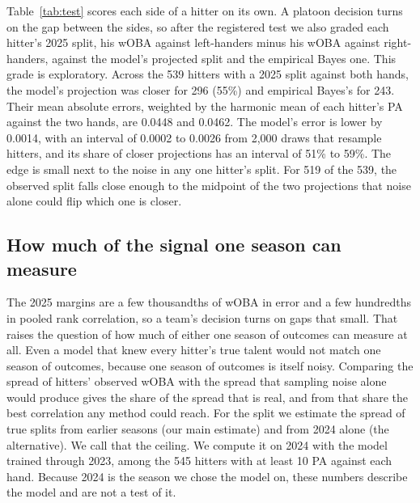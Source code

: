 \documentclass[11pt,letterpaper]{article}
\begin{document}
Table~\ref{tab:test} scores each side of a hitter on its own. A platoon decision turns on the gap between the sides, so after the registered test we also graded each hitter's 2025 split, his wOBA against left-handers minus his wOBA against right-handers, against the model's projected split and the empirical Bayes one. This grade is exploratory. Across the 539 hitters with a 2025 split against both hands, the model's projection was closer for 296 (55\%) and empirical Bayes's for 243. Their mean absolute errors, weighted by the harmonic mean of each hitter's PA against the two hands, are 0.0448 and 0.0462. The model's error is lower by 0.0014, with an interval of 0.0002 to 0.0026 from 2,000 draws that resample hitters, and its share of closer projections has an interval of 51\% to 59\%. The edge is small next to the noise in any one hitter's split. For 519 of the 539, the observed split falls close enough to the midpoint of the two projections that noise alone could flip which one is closer.

\subsection{How much of the signal one season can measure}
\label{sec:ceiling}

The 2025 margins are a few thousandths of wOBA in error and a few hundredths in pooled rank correlation, so a team's decision turns on gaps that small. That raises the question of how much of either one season of outcomes can measure at all. Even a model that knew every hitter's true talent would not match one season of outcomes, because one season of outcomes is itself noisy. Comparing the spread of hitters' observed wOBA with the spread that sampling noise alone would produce gives the share of the spread that is real, and from that share the best correlation any method could reach. For the split we estimate the spread of true splits from earlier seasons (our main estimate) and from 2024 alone (the alternative). We call that the ceiling. We compute it on 2024 with the model trained through 2023, among the 545 hitters with at least 10 PA against each hand. Because 2024 is the season we chose the model on, these numbers describe the model and are not a test of it.
\end{document}
